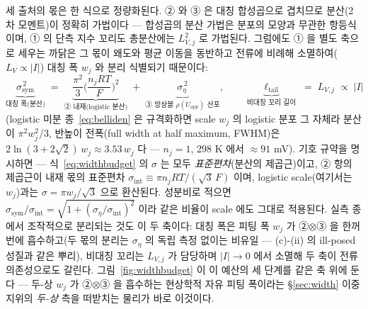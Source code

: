\documentclass[11pt,a4paper]{article}
\newcommand{\app}{\mathrm{app}}
\begin{document}
세 출처의 몫은 한 식으로 정량화된다. ② 와 ③ 은 대칭 합성곱으로 겹치므로 분산(2차 모멘트)이 정확히
가법이다 — 합성곱의 분산 가법은 분포의 모양과 무관한 항등식이며, ① 의 단측 지수 꼬리도 총분산에는
$L_{V,j}^2$ 로 가법된다. 그럼에도 ① 을 별도 축으로 세우는 까닭은 그 몫이 왜도와 평균 이동을 동반하고
전류에 비례해 소멸하여($L_V\propto|I|$) 대칭 폭 $w_j$ 와 분리 식별되기 때문이다:
\begin{equation}
\underbrace{\sigma_\mathrm{sym}^{\,2}}_{\text{대칭 폭(분산)}}
\;=\;\underbrace{\frac{\pi^2}{3}\Big(\frac{n_jRT}{F}\Big)^{\!2}}_{\text{② 내재(logistic 분산)}}
\;+\;\underbrace{\sigma_\eta^{\,2}}_{\text{③ 앙상블 }\rho(U_\app)\text{ 산포}},
\qquad
\underbrace{\ell_\mathrm{tail}}_{\text{비대칭 꼬리 길이}}\;=\;L_{V,j}\;\propto\;|I|
\label{eq:widthbudget}
\end{equation}
(logistic 미분 종~\eqref{eq:belliden} 은 규격화하면 scale $w_j$ 의 logistic 분포 그 자체라 분산이
$\pi^2w_j^2/3$, 반높이 전폭(full width at half maximum, FWHM)은
$2\ln(3+2\sqrt2)\,w_j\approx3.53\,w_j$ 다 — $n_j{=}1$,
298 K 에서 $\approx91$ mV). 기호 규약을 명시하면 — 식~\eqref{eq:widthbudget} 의 $\sigma$ 는 모두
\emph{표준편차}(분산의 제곱근)이고, ② 항의 제곱근이 내재 몫의 표준편차
$\sigma_\mathrm{int}\equiv\pi n_jRT/(\sqrt3\,F)$ 이며, logistic scale(여기서는 $w_j$)과는
$\sigma=\pi w_j/\sqrt3$ 으로 환산된다. 성분비로 적으면
$\sigma_\mathrm{sym}/\sigma_\mathrm{int}=\sqrt{1+(\sigma_\eta/\sigma_\mathrm{int})^2}$ 이라 같은
비율이 scale 에도 그대로 적용된다. 실측 종에서 조작적으로 분리되는 것도 이 두 축이다: 대칭 폭은 피팅 폭 $w_j$ 가
②$\otimes$③ 을 한꺼번에 흡수하고(두 몫의 분리는 $\sigma_\eta$ 의 독립 측정 없이는 비유일 — (c)-(ii) 의
ill-posed 성질과 같은 뿌리), 비대칭 꼬리는 $L_{V,j}$ 가 담당하며 $|I|\!\to\!0$ 에서 소멸해 두 축이 전류
의존성으로도 갈린다. 그림~\ref{fig:widthbudget} 이 이 예산의 세 단계를 같은 축 위에 둔다 — 두-상 $w_j$ 가
②$\otimes$③ 을 흡수하는 현상학적 자유 피팅 폭이라는 \S\ref{sec:width} 이중지위의 \emph{두-상} 측을
떠받치는 물리가 바로 이것이다.
\end{document}
